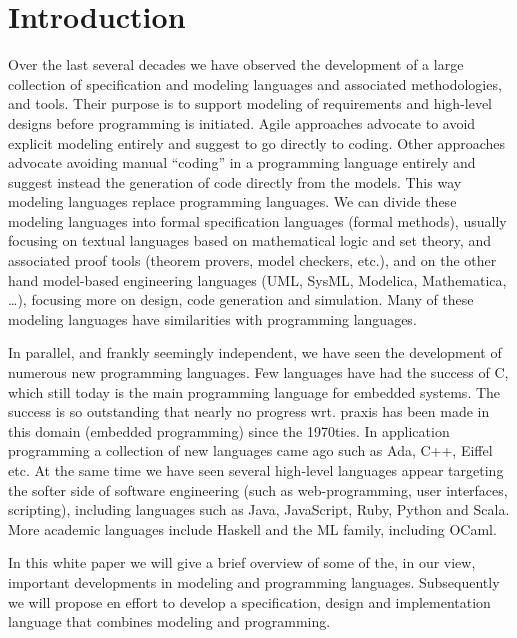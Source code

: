 
\section{Introduction}

Over the last several decades we have observed the development of a 
large collection of specification and modeling languages and 
associated methodologies, and tools. Their purpose is to 
support modeling of requirements and high-level designs before 
programming is initiated. Agile approaches advocate to avoid 
explicit modeling entirely and suggest to go directly to coding. 
Other approaches advocate avoiding manual “coding” in a programming 
language entirely and suggest instead the generation of code 
directly from the models. This way modeling languages replace 
programming languages.  We can divide these modeling languages into 
formal specification languages (formal methods), usually focusing 
on textual languages based on mathematical logic and set theory, 
and associated proof tools (theorem provers, model checkers, etc.), 
and on the other hand model-based engineering languages (UML, 
SysML, Modelica, Mathematica, …), focusing more on design, code 
generation and simulation. Many of these modeling languages have 
similarities with programming languages.

In parallel, and frankly seemingly independent, we have seen the 
development of numerous new programming languages. Few languages 
have had the success of C, which still today is the main 
programming language for embedded systems. The success is so 
outstanding that nearly no progress wrt. praxis has been made in 
this domain (embedded programming) since the 1970ties.  In 
application programming a collection of new languages came ago such 
as Ada, C++, Eiffel etc. At the same time we have seen several 
high-level languages appear targeting the softer side of software 
engineering (such as web-programming, user interfaces, scripting), 
including languages such as Java, JavaScript, Ruby, Python and 
Scala.  More academic languages include Haskell and the ML family, 
including OCaml.

In this white paper we will give a brief overview of some of the, 
in our view, important developments in modeling and programming 
languages. Subsequently we will propose en effort to develop a 
specification, design and implementation language that combines 
modeling and programming.

